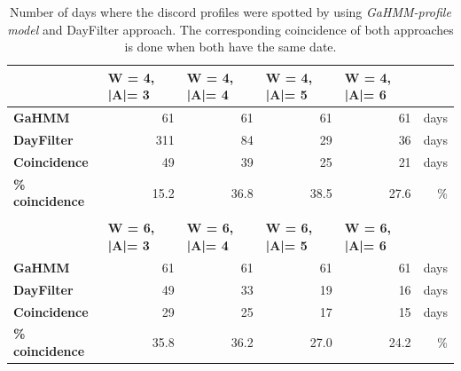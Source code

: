 \begin{table}[htbp]
  \centering
  \scriptsize
  \caption{Number of days where the discord profiles were spotted by using \textit{GaHMM-profile model} and DayFilter approach. The corresponding coincidence of both approaches is done when both have the same date.}
    \begin{tabular}{|l|r|r|r|r|r|}
    \hline
         & \multicolumn{1}{l|}{\textbf{W = 4, |A|= 3}} & \multicolumn{1}{l|}{\textbf{W = 4, |A|= 4}} & \multicolumn{1}{l|}{\textbf{W = 4, |A|= 5}} & \multicolumn{1}{l|}{\textbf{W = 4, |A|= 6}} &  \bigstrut\\
    \hline
    \textbf{GaHMM} & 61   & 61   & 61   & 61   & days \bigstrut\\
    \hline
    \textbf{DayFilter} & 311  & 84   & 29   & 36   & days \bigstrut\\
    \hline
    \textbf{Coincidence} & 49   & 39   & 25   & 21   & days \bigstrut\\
    \hline
    \textbf{\% coincidence} & \cellcolor[rgb]{ .973,  .412,  .42} 15.2 & \cellcolor[rgb]{ .553,  .796,  .494} 36.8 & \cellcolor[rgb]{ .388,  .745,  .482} 38.5 & \cellcolor[rgb]{ .992,  .784,  .49} 27.6 & \% \bigstrut\\
    \hline
    \multicolumn{1}{r}{} & \multicolumn{1}{r}{} & \multicolumn{1}{r}{} & \multicolumn{1}{r}{} & \multicolumn{1}{r}{} & \multicolumn{1}{r}{} \bigstrut\\
    \hline
         & \multicolumn{1}{l|}{\textbf{W = 6, |A|= 3}} & \multicolumn{1}{l|}{\textbf{W = 6, |A|= 4}} & \multicolumn{1}{l|}{\textbf{W = 6, |A|= 5}} & \multicolumn{1}{l|}{\textbf{W = 6, |A|= 6}} &  \bigstrut\\
    \hline
    \textbf{GaHMM} & 61   & 61   & 61   & 61   & days \bigstrut\\
    \hline
    \textbf{DayFilter} & 49   & 33   & 19   & 16   & days \bigstrut\\
    \hline
    \textbf{Coincidence} & 29   & 25   & 17   & 15   & days \bigstrut\\
    \hline
    \textbf{\% coincidence} & \cellcolor[rgb]{ .443,  .761,  .486} 35.8 & \cellcolor[rgb]{ .388,  .745,  .482} 36.2 & \cellcolor[rgb]{ .98,  .608,  .455} 27.0 & \cellcolor[rgb]{ .973,  .412,  .42} 24.2 & \% \bigstrut\\
    \hline
    \end{tabular}%
  \label{tab:SAX_vs_GaHMM}%
\end{table}%


